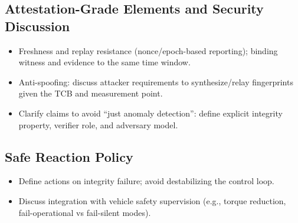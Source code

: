 \subsection{Attestation-Grade Elements and Security Discussion}
\begin{itemize}
    \item Freshness and replay resistance (nonce/epoch-based reporting); binding witness and evidence to the same time window.
    \item Anti-spoofing: discuss attacker requirements to synthesize/relay fingerprints given the TCB and measurement point.
    \item Clarify claims to avoid ``just anomaly detection'': define explicit integrity property, verifier role, and adversary model.
\end{itemize}

\subsection{Safe Reaction Policy}
\begin{itemize}
    \item Define actions on integrity failure; avoid destabilizing the control loop.
    \item Discuss integration with vehicle safety supervision (e.g., torque reduction, fail-operational vs fail-silent modes).
\end{itemize}
